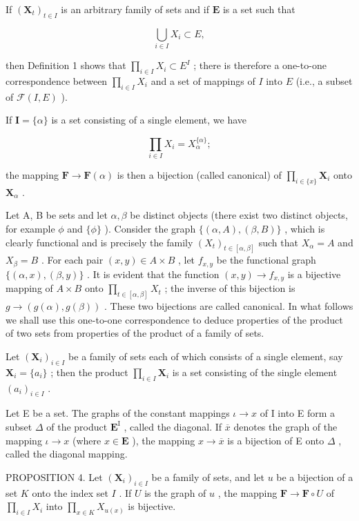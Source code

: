 If \((\mathbf{X}_t)_{t\in I}\) is an arbitrary family of sets and if \(\mathbf{E}\) is a set such that

\[
\bigcup_ {i \in I} X _ {i} \subset E,
\]

then Definition 1 shows that \(\prod_{i\in I}X_i\subset E^I\) ; there is therefore a one-to-one correspondence between \(\prod_{i\in I}X_i\) and a set of mappings of \(I\) into \(E\) (i.e., a subset of \(\mathcal{F}(I,E)\) ).

If \(\mathbf{I} = \{\alpha\}\) is a set consisting of a single element, we have

\[
\prod_ {i \in I} X _ {i} = X _ {\alpha} ^ {\{\alpha \}};
\]

the mapping \(\mathbf{F} \to \mathbf{F}(\alpha)\) is then a bijection (called canonical) of \(\prod_{i \in \{x\}} \mathbf{X}_i\) onto \(\mathbf{X}_\alpha\) .

Let A, B be sets and let \(\alpha, \beta\) be distinct objects (there exist two distinct objects, for example \(\phi\) and \(\{\phi\}\) ). Consider the graph \(\{(\alpha, A), (\beta, B)\}\) , which is clearly functional and is precisely the family \((X_{t})_{t \in [\alpha, \beta]}\) such that \(X_{\alpha} = A\) and \(X_{\beta} = B\) . For each pair \((x, y) \in A \times B\) , let \(f_{x,y}\) be the functional graph \(\{(\alpha, x), (\beta, y)\}\) . It is evident that the function \((x, y) \to f_{x,y}\) is a bijective mapping of \(A \times B\) onto \(\prod_{t \in [\alpha, \beta]} X_t\) ; the inverse of this bijection is \(g \to (g(\alpha), g(\beta))\) . These two bijections are called canonical. In what follows we shall use this one-to-one correspondence to deduce properties of the product of two sets from properties of the product of a family of sets.

Let \((\mathbf{X}_i)_{i\in I}\) be a family of sets each of which consists of a single element, say \(\mathbf{X}_i = \{a_i\}\) ; then the product \(\prod_{i\in I}\mathbf{X}_i\) is a set consisting of the single element \((a_i)_{i\in I}\) .

Let E be a set. The graphs of the constant mappings \(\iota \to x\) of I into E form a subset \(\Delta\) of the product \(\mathbf{E}^{\mathrm{I}}\) , called the diagonal. If \(\overline{x}\) denotes the graph of the mapping \(\iota \to x\) (where \(x \in \mathbf{E}\) ), the mapping \(x \to \overline{x}\) is a bijection of E onto \(\Delta\) , called the diagonal mapping.

PROPOSITION 4. Let \((\mathbf{X}_i)_{i\in I}\) be a family of sets, and let \(u\) be a bijection of a set \(K\) onto the index set \(I\) . If \(U\) is the graph of \(u\) , the mapping \(\mathbf{F} \to \mathbf{F} \circ U\) of \(\prod_{i\in I} X_i\) into \(\prod_{x\in K} X_{u(x)}\) is bijective.

